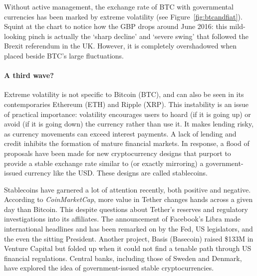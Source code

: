 Without active management, the exchange rate of BTC with governmental currencies has been marked by extreme volatility (see Figure~\ref{fig:btcandfiat}). Squint at the chart to notice how the GBP drops around June 2016: this mild-looking pinch is actually the  `sharp decline' and `severe swing' that followed the Brexit referendum in the UK. However, it is completely overshadowed when placed beside BTC's large fluctuations.

\paragraph{A third wave?} Extreme volatility is not specific to Bitcoin (BTC), and can also be seen in its contemporaries Ethereum (ETH) and Ripple (XRP). This instability is an issue of practical importance: volatility encourages users to hoard (if it is going up) or avoid (if it is going down) the currency rather than use it. It makes lending risky, as currency movements can exceed interest payments. A lack of lending and credit inhibits the formation of mature financial markets. In response, a flood of proposals have been made for new cryptocurrency designs that purport to provide a stable exchange rate similar to (or exactly mirroring) a government-issued currency like the USD. These designs are called stablecoins.

Stablecoins have garnered a lot of attention recently, both positive and negative. According to \textit{CoinMarketCap}, more value in Tether changes hands across a given day than Bitcoin. This despite questions about Tether's reserves and regulatory investigations into its affiliates. The announcement of Facebook's Libra made international headlines and has been remarked on by the Fed, US legislators, and the even the sitting President. Another project, Basis (\nee Basecoin) raised \$133M in Venture Capital but folded up when it could not find a tenable path through US financial regulations. Central banks, including those of Sweden and Denmark, have explored the idea of government-issued stable cryptocurrencies.

